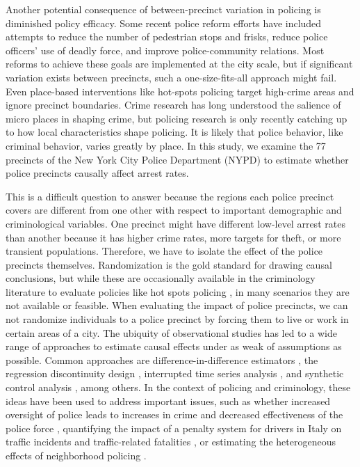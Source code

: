 \documentclass[a4paper,11pt]{article}
\begin{document}
Another potential consequence of between-precinct variation in policing is diminished policy efficacy. Some recent police reform efforts have included attempts to reduce the number of pedestrian stops and frisks, reduce police officers' use of deadly force, and improve police-community relations. Most reforms to achieve these goals are implemented at the city scale, but if significant variation exists between precincts, such a one-size-fits-all approach might fail. Even place-based interventions like hot-spots policing target high-crime areas and ignore precinct boundaries. Crime research has long understood the salience of micro places in shaping crime, but policing research is only recently catching up to how local characteristics shape policing. It is likely that police behavior, like criminal behavior, varies greatly by place. In this study, we examine the 77 precincts of the New York City Police Department (NYPD) to estimate whether police precincts causally affect arrest rates.

This is a difficult question to answer because the regions each police precinct covers are different from one other with respect to important demographic and criminological variables. One precinct might have different low-level arrest rates than another because it has higher crime rates, more targets for theft, or more transient populations. Therefore, we have to isolate the effect of the police precincts themselves. Randomization is the gold standard for drawing causal conclusions, but while these are occasionally available in the criminology literature to evaluate policies like hot spots policing \citep{puelz2019graph}, in many scenarios they are not available or feasible. When evaluating the impact of police precincts, we can not randomize individuals to a police precinct by forcing them to live or work in certain areas of a city. The ubiquity of observational studies has led to a wide range of approaches to estimate causal effects under as weak of assumptions as possible. Common approaches are difference-in-difference estimators \citep{ashenfelter1984using, lechner2011estimation}, the regression discontinuity design \citep{thistlethwaite1960regression,imbens2008regression, cattaneo2019regression}, interrupted time series analysis \citep{cook1979quasi, bernal2017interrupted}, and synthetic control analysis \citep{abadie2010synthetic}, among others. In the context of policing and criminology, these ideas have been used to address important issues, such as whether increased oversight of police leads to increases in crime and decreased effectiveness of the police force \citep{ba2019effect}, quantifying the impact of a penalty system for drivers in Italy on traffic incidents and traffic-related fatalities \citep{de2013deterrent}, or estimating the heterogeneous effects of neighborhood policing \citep{antonelli2020estimating, beck2020effects}.
\end{document}
